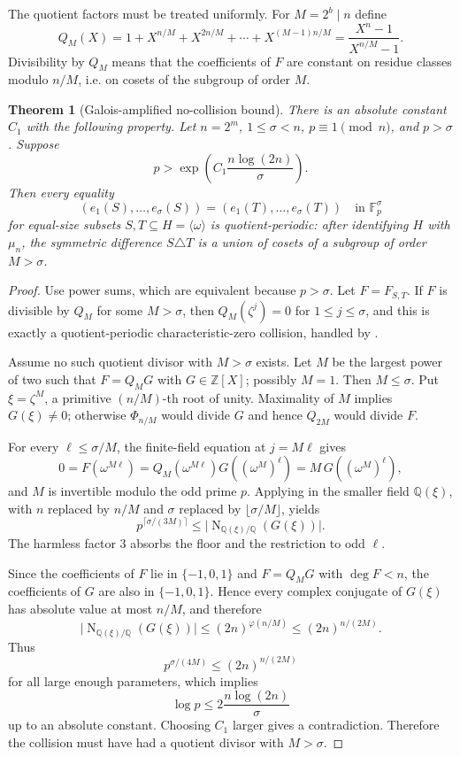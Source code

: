 \documentclass[11pt]{article}
\newtheorem{theorem}{Theorem}[section]
\theoremstyle{definition}
\newcommand{\F}{\mathbb F}
\newcommand{\Z}{\mathbb Z}
\newcommand{\Q}{\mathbb Q}
\newcommand{\Norm}{\operatorname{N}}
\begin{document}
The quotient factors must be treated uniformly.  For $M=2^b\mid n$ define
\[
        Q_M(X)=1+X^{n/M}+X^{2n/M}+\cdots+X^{(M-1)n/M}=\frac{X^n-1}{X^{n/M}-1}.
\]
Divisibility by $Q_M$ means that the coefficients of $F$ are constant on residue classes modulo $n/M$, i.e. on cosets of the subgroup of order $M$.

\begin{theorem}[Galois-amplified no-collision bound]\label{thm:no-collision}
There is an absolute constant $C_1$ with the following property.  Let $n=2^m$, $1\le\sigma<n$, $p\equiv1\pmod n$, and $p>\sigma$.  Suppose
\[
        p>\exp\!\left(C_1\frac{n\log(2n)}{\sigma}\right).
\]
Then every equality
\[
        (e_1(S),\ldots,e_\sigma(S))=(e_1(T),\ldots,e_\sigma(T))\quad\text{in }\F_p^\sigma
\]
for equal-size subsets $S,T\subseteq H=\langle\omega\rangle$ is quotient-periodic: after identifying $H$ with $\mu_n$, the symmetric difference $S\triangle T$ is a union of cosets of a subgroup of order $M>\sigma$.
\end{theorem}

\begin{proof}
Use power sums, which are equivalent because $p>\sigma$.  Let $F=F_{S,T}$.  If $F$ is divisible by $Q_M$ for some $M>\sigma$, then $Q_M(\zeta^j)=0$ for $1\le j\le\sigma$, and this is exactly a quotient-periodic characteristic-zero collision, handled by .

Assume no such quotient divisor with $M>\sigma$ exists.  Let $M$ be the largest power of two such that $F=Q_MG$ with $G\in\Z[X]$; possibly $M=1$.  Then $M\le\sigma$.  Put $\xi=\zeta^M$, a primitive $(n/M)$-th root of unity.  Maximality of $M$ implies $G(\xi)\ne0$; otherwise $\Phi_{n/M}$ would divide $G$ and hence $Q_{2M}$ would divide $F$.

For every $\ell\le\sigma/M$, the finite-field equation at $j=M\ell$ gives
\[
        0=F(\omega^{M\ell})=Q_M(\omega^{M\ell})G((\omega^M)^\ell)=M\,G((\omega^M)^\ell),
\]
and $M$ is invertible modulo the odd prime $p$.  Applying  in the smaller field $\Q(\xi)$, with $n$ replaced by $n/M$ and $\sigma$ replaced by $\lfloor\sigma/M\rfloor$, yields
\[
        p^{\lceil\sigma/(3M)\rceil}\le \big|\Norm_{\Q(\xi)/\Q}(G(\xi))\big|.
\]
The harmless factor $3$ absorbs the floor and the restriction to odd $\ell$.

Since the coefficients of $F$ lie in $\{-1,0,1\}$ and $F=Q_MG$ with $\deg F<n$, the coefficients of $G$ are also in $\{-1,0,1\}$.  Hence every complex conjugate of $G(\xi)$ has absolute value at most $n/M$, and therefore
\[
        \big|\Norm_{\Q(\xi)/\Q}(G(\xi))\big|
        \le (2n)^{\varphi(n/M)}
        \le (2n)^{n/(2M)}.
\]
Thus
\[
        p^{\sigma/(4M)}\le (2n)^{n/(2M)}
\]
for all large enough parameters, which implies
\[
        \log p\le 2\frac{n\log(2n)}{\sigma}
\]
up to an absolute constant.  Choosing $C_1$ larger gives a contradiction.  Therefore the collision must have had a quotient divisor with $M>\sigma$.
\end{proof}
\end{document}
